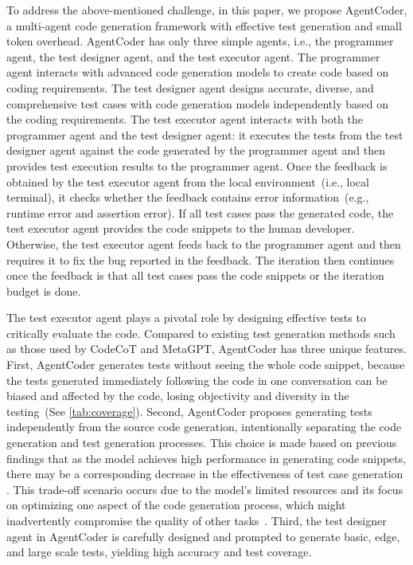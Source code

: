 \documentclass{article}
\newcommand{\xxx}{AgentCoder\xspace}
\begin{document}
To address the above-mentioned challenge, in this paper, we propose \xxx,
a multi-agent code generation framework with effective test generation and small token overhead. 
\xxx has only three simple agents, i.e., the programmer agent, the test designer agent, and the test executor agent. The programmer agent interacts with advanced code generation models to create code based on coding requirements. The test designer agent designs accurate, diverse, and comprehensive test cases with code generation models independently based on the coding requirements. The test executor agent interacts with both the programmer agent and the test designer agent: it executes the tests from the test designer agent against the code generated by the programmer agent and then provides test execution results to the programmer agent. Once the feedback is obtained by the test executor agent from the local environment~(i.e., local terminal), it checks whether the feedback contains error information~(e.g., runtime error and assertion error). If all test cases pass the generated code, the test executor agent provides the code snippets to the human developer. Otherwise, the test executor agent feeds back to the programmer agent and then requires it to fix the bug reported in the feedback. The iteration then continues once the feedback is that all test cases pass the code snippets or the iteration budget is done.

The test executor agent plays a pivotal role by designing effective tests to critically evaluate the code.
Compared to existing test generation methods such as those used by CodeCoT and MetaGPT, \xxx has three unique features.
First, \xxx generates tests without seeing the whole code snippet, because the tests generated immediately following the code in one conversation can be biased and affected by the code, losing objectivity and diversity in the testing~(See \cref{tab:coverage}). 
Second, \xxx proposes generating tests independently from the source code generation, intentionally separating the code generation and test generation processes.
This choice is made based on previous findings that as the model achieves high performance in generating code snippets, there may be a corresponding decrease in the effectiveness of test case generation \cite{Chen2023AgentVerseFM,Zhang2023ProAgentBP}. This trade-off scenario occurs due to the model's limited resources and its focus on optimizing one aspect of the code generation process, which might inadvertently compromise the quality of other tasks~\cite{Chen2023AgentVerseFM,Zhang2023ProAgentBP}.
Third, the test designer agent in \xxx is carefully designed and prompted to generate basic, edge,
and large scale tests, yielding high accuracy and test coverage.
\end{document}
